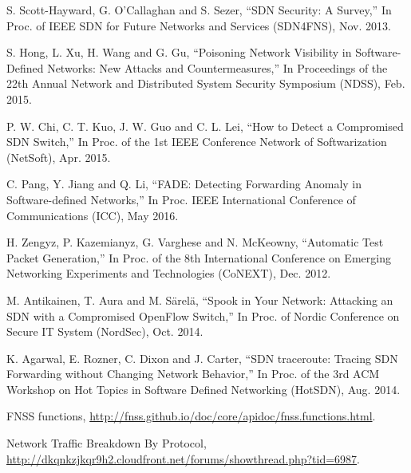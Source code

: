 \documentclass[conference]{IEEEtran}
\begin{document}
\begin{thebibliography}{1}

S. Scott-Hayward, G. O'Callaghan and S. Sezer,
``SDN Security: A Survey,'' In Proc. of IEEE SDN for Future Networks and Services (SDN4FNS), Nov. 2013.

S. Hong, L. Xu, H. Wang and G. Gu,
``Poisoning Network Visibility in Software-Defined Networks: New Attacks and Countermeasures,''  In Proceedings of the 22th Annual Network and Distributed System Security Symposium (NDSS), Feb. 2015.

P. W. Chi, C. T. Kuo, J. W. Guo and C. L. Lei,
``How to Detect a Compromised SDN Switch,'' In Proc. of the 1st IEEE Conference Network of Softwarization (NetSoft), Apr. 2015.

C. Pang, Y. Jiang and Q. Li,
``FADE: Detecting Forwarding Anomaly in Software-defined Networks,'' In Proc. IEEE International Conference of Communications (ICC), May 2016.

H. Zengyz, P. Kazemianyz, G. Varghese and N. McKeowny,
``Automatic Test Packet Generation,'' In Proc. of the 8th International Conference on Emerging Networking Experiments and Technologies (CoNEXT), Dec. 2012.

M. Antikainen, T. Aura and M. Särelä,
``Spook in Your Network: Attacking an SDN with a Compromised OpenFlow Switch,'' In Proc. of Nordic Conference on Secure IT System (NordSec), Oct. 2014.

K. Agarwal, E. Rozner, C. Dixon and J. Carter,
``SDN traceroute: Tracing SDN Forwarding without Changing Network Behavior,'' In Proc. of the 3rd ACM Workshop on Hot Topics in Software Defined Networking (HotSDN), Aug. 2014.

FNSS functions, \url{http://fnss.github.io/doc/core/apidoc/fnss.functions.html}.

Network Traffic Breakdown By Protocol, \url{http://dkqnkzjkqr9h2.cloudfront.net/forums/showthread.php?tid=6987}.
\end{thebibliography}
\end{document}
